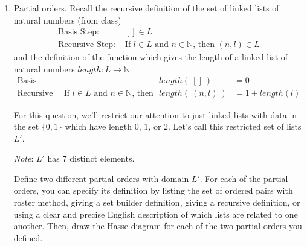 \documentclass[12pt, oneside]{article}
\begin{document}
\begin{enumerate}[labelindent=0pt, leftmargin=0pt]
\begin{enumerate}
        \item Does each integer $x$ between $1$ and $4$ (inclusive) have a modular inverse relative to modulus $5$? Does each integer $y$ between $1$ and $5$ (inclusive) have a modular inverse relative to modulus $6$?  Justify your answers using appropriate proof strategies and definitions.

        \item Is there an example of integers $x_1, x_2$ between $1$ and $4$ (inclusive) so that $x_1x_2 \equiv 0 (\textbf{mod } 5)$? Is there an example of integers $y_1, y_2$ between $1$ and $5$ (inclusive) so that $y_1y_2 \equiv 0 (\textbf{mod } 6)$?    Justify your answers using appropriate proof strategies and definitions.

    \end{enumerate}
    


    \item Partial orders. Recall the recursive definition of the set of linked lists of 
    natural numbers (from class)
    \[
    \begin{array}{ll}
        \textrm{Basis Step: } & [] \in L \\
        \textrm{Recursive Step: } & \textrm{If } l \in L\textrm{ and }n \in \mathbb{N} \textrm{, then } (n, l) \in L
    \end{array}
    \]
    and the definition of the function which gives the length of a linked list of natural numbers 
    $length: L \to \mathbb{N}$
        \[
        \begin{array}{llll}
            \textrm{Basis Step:} &  & length(~[]~) &= 0 \\
            \textrm{Recursive Step:} & \textrm{If } l \in L\textrm{ and }n \in \mathbb{N}\textrm{, then  } & length(~(n, l)~)  &= 1+ length(l)
        \end{array}
         \]
     
    For this question, we'll restrict our attention to just linked lists with data in the set $\{0,1\}$
    which have length $0$, $1$, or $2$. Let's call this restricted set of lists $L'$.
    
    {\it Note}: $L'$ has $7$ distinct elements.

    Define two different partial orders with domain $L'$. For each of the partial orders, you  can specify its definition by
    listing the set of ordered pairs with roster method, giving a set builder
    definition, giving a recursive definition, or using a clear and precise English description of which lists are related to one another.
    Then, draw the Hasse diagram for each of the two partial orders you defined.



\end{enumerate}
\end{document}
